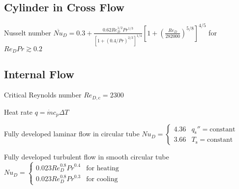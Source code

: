 \documentclass{article}
\begin{document}
\subsection{Cylinder in Cross Flow}
\begin{description*}
\item[Nusselt number]
  \(\overline{\mathit{Nu}}_D
  = 0.3 + \frac{0.62\mathit{Re}_D^{1/2}\mathit{Pr}^{1/3}}
               {[1+(0.4/\mathit{Pr})^{2/3}]^{1/4}}
          \left[1 + \left(\frac{\mathit{Re}_D}{282000}\right)^{5/8}\right]^{4/5}\)
  for \(\mathit{Re}_D\mathit{Pr} \gtrsim 0.2\)
\end{description*}

\subsection{Internal Flow}
\begin{description*}
\item[Critical Reynolds number]
  \(\mathit{Re}_{D,\mathrm{c}} = \num{2300}\)
\item[Heat rate]
  \(q = \dot{m}c_p\Delta{}T\)
\item[Fully developed laminar flow in circular tube]
  \(\mathit{Nu}_D =
  \begin{cases}
    4.36 & q_\mathrm{s}'' = \textrm{constant} \\
    3.66 & T_\mathrm{s} = \textrm{constant}
  \end{cases}\)
\item[Fully developed turbulent flow in smooth circular tube]
  \(\mathit{Nu}_D =
  \begin{cases}
    0.023\mathit{Re}_D^{0.8}\mathit{Pr}^{0.4} & \textrm{for heating} \\
    0.023\mathit{Re}_D^{0.8}\mathit{Pr}^{0.3} & \textrm{for cooling}
  \end{cases}\)
\end{description*}
\end{document}
